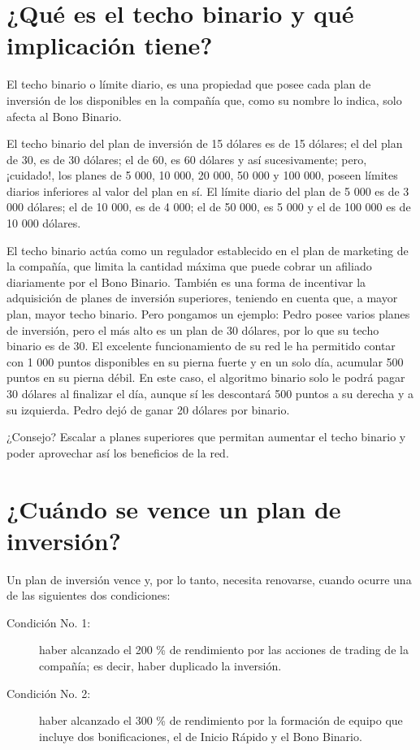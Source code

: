 \documentclass[12pt,letterpaper]{article}
\begin{document}
\section{¿Qué es el techo binario y qué implicación tiene?}
El techo binario o límite diario, es una propiedad que posee cada plan de inversión de los disponibles en la compañía que, como su nombre lo indica, solo afecta al Bono Binario. 

El techo binario del plan de inversión de 15 dólares es de 15 dólares; el del plan de 30, es de 30 dólares; el de 60, es 60 dólares y así sucesivamente; pero, ¡cuidado!, los planes de 5 000, 10 000, 20 000, 50 000 y 100 000, poseen límites diarios inferiores al valor del plan en sí. El límite diario del plan de 5 000 es de 3 000 dólares; el de 10 000, es de 4 000; el de 50 000, es 5 000 y el de 100 000 es de 10 000 dólares. 

El techo binario actúa como un regulador establecido en el plan de marketing de la compañía, que limita la cantidad máxima que puede cobrar un afiliado diariamente por el Bono Binario. También es una forma de incentivar la adquisición de planes de inversión superiores, teniendo en cuenta que, a mayor plan, mayor techo binario. Pero pongamos un ejemplo: Pedro posee varios planes de inversión, pero el más alto es un plan de 30 dólares, por lo que su techo binario es de 30. El excelente funcionamiento de su red le ha permitido contar con 1 000 puntos disponibles en su pierna fuerte y en un solo día, acumular 500 puntos en su pierna débil. En este caso, el algoritmo binario solo le podrá pagar 30 dólares al finalizar el día, aunque sí les descontará 500 puntos a su derecha y a su izquierda. Pedro dejó de ganar 20 dólares por binario. 

¿Consejo? Escalar a planes superiores que permitan aumentar el techo binario y poder aprovechar así los beneficios de la red.

\section{¿Cuándo se vence un plan de inversión?}
Un plan de inversión vence y, por lo tanto, necesita renovarse, cuando ocurre una de las siguientes dos condiciones:
\begin{description}
	\item[Condición No. 1:] haber alcanzado el 200 \% de rendimiento por las acciones de trading de la compañía; es decir, haber duplicado la inversión. 
	\item[Condición No. 2:] haber alcanzado el 300 \% de rendimiento por la formación de equipo que incluye dos bonificaciones, el de Inicio Rápido y el Bono Binario.
\end{description}
  
\end{document}
